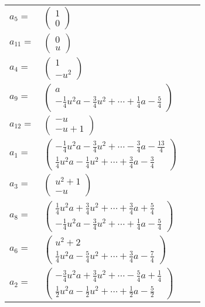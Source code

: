 \documentclass[1p]{elsarticle_modified}
\theoremstyle{definition}
\begin{document}
\begin{tabular}{m{7pt} m{180pt} m{7pt} m{180pt} }
\flushright $a_{5}=$&$\begin{pmatrix}1\\0\end{pmatrix}$ \\
\flushright $a_{11}=$&$\begin{pmatrix}0\\u\end{pmatrix}$ \\
\flushright $a_{4}=$&$\begin{pmatrix}1\\- u^2\end{pmatrix}$ \\
\flushright $a_{9}=$&$\begin{pmatrix}a\\-\frac{1}{4} u^2 a-\frac{3}{4} u^2+\cdots+\frac{1}{4} a-\frac{5}{4}\end{pmatrix}$ \\
\flushright $a_{12}=$&$\begin{pmatrix}- u\\- u+1\end{pmatrix}$ \\
\flushright $a_{1}=$&$\begin{pmatrix}-\frac{1}{4} u^2 a-\frac{3}{4} u^2+\cdots-\frac{3}{4} a-\frac{13}{4}\\\frac{1}{4} u^2 a-\frac{1}{4} u^2+\cdots+\frac{3}{4} a-\frac{3}{4}\end{pmatrix}$ \\
\flushright $a_{3}=$&$\begin{pmatrix}u^2+1\\- u\end{pmatrix}$ \\
\flushright $a_{8}=$&$\begin{pmatrix}\frac{1}{4} u^2 a+\frac{3}{4} u^2+\cdots+\frac{3}{4} a+\frac{5}{4}\\-\frac{1}{4} u^2 a-\frac{3}{4} u^2+\cdots+\frac{1}{4} a-\frac{5}{4}\end{pmatrix}$ \\
\flushright $a_{6}=$&$\begin{pmatrix}u^2+2\\\frac{1}{4} u^2 a-\frac{5}{4} u^2+\cdots+\frac{3}{4} a-\frac{7}{4}\end{pmatrix}$ \\
\flushright $a_{2}=$&$\begin{pmatrix}-\frac{3}{4} u^2 a+\frac{3}{4} u^2+\cdots-\frac{5}{4} a+\frac{1}{4}\\\frac{1}{2} u^2 a-\frac{1}{2} u^2+\cdots+\frac{1}{2} a-\frac{5}{2}\end{pmatrix}$ \\

\end{tabular}
\end{document}
